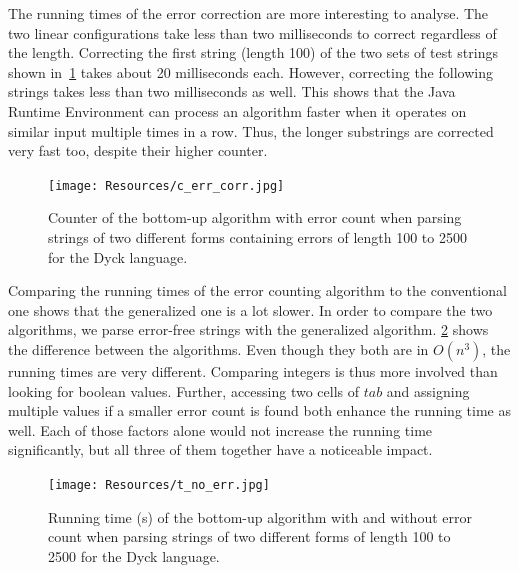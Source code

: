 The running times of the error correction are more interesting to analyse.
The two linear configurations take less than two milliseconds to correct regardless of the length.
Correcting the first string (length 100) of the two sets of test strings shown in~\cref{fig:c_err_corr} takes about 20 milliseconds each.
However, correcting the following strings takes less than two milliseconds as well.
This shows that the Java Runtime Environment can process an algorithm faster when it operates on similar input multiple times in a row.
Thus, the longer substrings are corrected very fast too, despite their higher counter.

\begin{figure}[!ht]
    \centering
    \texttt{[image: Resources/c\_err\_corr.jpg]}
    \caption{Counter of the bottom-up algorithm with error count when parsing strings of two different forms containing errors of length 100 to 2500 for the Dyck language.}
    \label{fig:c_err_corr}
\end{figure}

Comparing the running times of the error counting algorithm to the conventional one shows that the generalized one is a lot slower.
In order to compare the two algorithms, we parse error-free strings with the generalized algorithm.
\cref{fig:t_no_err} shows the difference between the algorithms.
Even though they both are in $O(n^3)$, the running times are very different.
Comparing integers is thus more involved than looking for boolean values.
Further, accessing two cells of $tab $ and assigning multiple values if a smaller error count is found both enhance the running time as well.
Each of those factors alone would not increase the running time significantly, but all three of them together have a noticeable impact.

\begin{figure}[!ht]
    \centering
    \texttt{[image: Resources/t\_no\_err.jpg]}
    \caption{Running time (s) of the bottom-up algorithm with and without error count when parsing strings of two different forms of length 100 to 2500 for the Dyck language.}
    \label{fig:t_no_err}
\end{figure}

